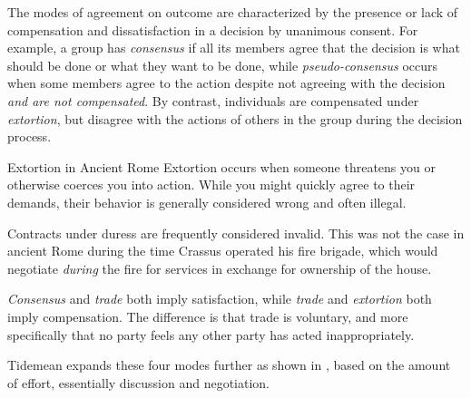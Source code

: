 The modes of agreement on outcome are characterized by the presence or lack of compensation and dissatisfaction in a decision by unanimous consent.  For example, a group has \textit{consensus} if all its members agree that the decision is what should be done or what they want to be done, while \textit{pseudo-consensus} occurs when some members agree to the action despite not agreeing with the decision \textit{and are not compensated}.  By contrast, individuals are compensated under \textit{extortion}, but disagree with the actions of others in the group during the decision process.

\begin{commentary}{Extortion in Ancient Rome}
    Extortion occurs when someone threatens you or otherwise coerces you into action.  While you might quickly agree to their demands, their behavior is generally considered wrong and often illegal.

    Contracts under duress are frequently considered invalid.  This was not the case in ancient Rome during the time Crassus operated his fire brigade, which would negotiate \textit{during} the fire for services in exchange for ownership of the house.
\end{commentary}

\textit{Consensus} and \textit{trade} both imply satisfaction, while \textit{trade} and \textit{extortion} both imply compensation.  The difference is that trade is voluntary, and more specifically that no party feels any other party has acted inappropriately.

Tidemean expands these four modes further as shown in , based on the amount of effort, essentially discussion and negotiation.



